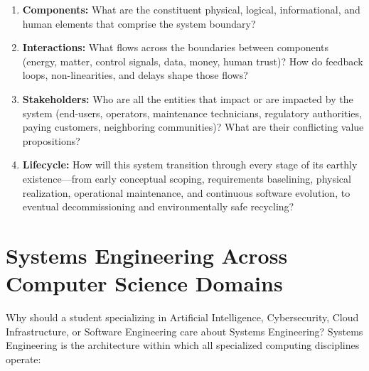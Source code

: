 \begin{enumerate}[leftmargin=2em]
    \item \textbf{Components:} What are the constituent physical, logical, informational, and human elements that comprise the system boundary?
    \item \textbf{Interactions:} What flows across the boundaries between components (energy, matter, control signals, data, money, human trust)? How do feedback loops, non-linearities, and delays shape those flows?
    \item \textbf{Stakeholders:} Who are all the entities that impact or are impacted by the system (end-users, operators, maintenance technicians, regulatory authorities, paying customers, neighboring communities)? What are their conflicting value propositions?
    \item \textbf{Lifecycle:} How will this system transition through every stage of its earthly existence—from early conceptual scoping, requirements baselining, physical realization, operational maintenance, and continuous software evolution, to eventual decommissioning and environmentally safe recycling?
\end{enumerate}

\section{Systems Engineering Across Computer Science Domains}
\label{sec:se_across_cse}

Why should a student specializing in Artificial Intelligence, Cybersecurity, Cloud Infrastructure, or Software Engineering care about Systems Engineering? Systems Engineering is the architecture within which all specialized computing disciplines operate:

